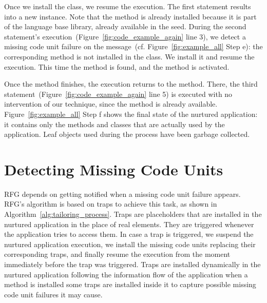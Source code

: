 Once we install the  class, we resume the execution. The first statement results into a new  instance. Note that the  method is already installed because it is part of the language base library, already available in the seed. 
During the second statement's execution~(Figure~\ref{fig:code_example_again} line 3), we detect a missing code unit failure on the  message~(cf. Figure~\ref{fig:example_all} Step e): the corresponding method is not installed in the  class. We install it and resume the execution. This time the method is found, and the  method is activated.



Once the  method finishes, the execution returns to the  method. There, the third statement~(Figure~\ref{fig:code_example_again} line 5) is executed with no intervention of our technique, since the  method is already available. Figure~\ref{fig:example_all} Step f shows the final state of the nurtured application: it contains only the methods and classes that are actually used by the application. Leaf objects used during the process have been garbage collected.


\section{Detecting Missing Code Units}\label{sec:model_detail}


RFG depends on getting notified when a missing code unit failure appears. RFG's algorithm is based on traps to achieve this task, as shown in Algorithm~\ref{alg:tailoring_process}. Traps are placeholders that are installed in the nurtured application in the place of real elements. They are triggered whenever the application tries to access them. In case a trap is triggered, we suspend the nurtured application execution, we install the missing code units replacing their corresponding traps, and finally resume the execution from the moment immediately before the trap was triggered. Traps are installed dynamically in the nurtured application following the information flow of the application \eg when a method  is installed some traps are installed inside it to capture possible missing code unit failures it may cause.

